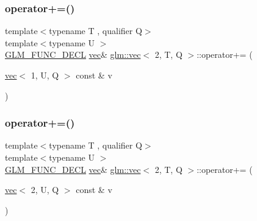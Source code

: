 \subsubsection{\texorpdfstring{operator+=()}{operator+=()}\hspace{0.1cm}{\footnotesize\ttfamily [5/6]}}
{\footnotesize\ttfamily template$<$typename T , qualifier Q$>$ \\
template$<$typename U $>$ \\
\hyperlink{setup_8hpp_ab2d052de21a70539923e9bcbf6e83a51}{G\+L\+M\+\_\+\+F\+U\+N\+C\+\_\+\+D\+E\+CL} \hyperlink{structglm_1_1vec}{vec}\& \hyperlink{structglm_1_1vec}{glm\+::vec}$<$ 2, T, Q $>$\+::operator+= (\begin{DoxyParamCaption}\item[{\hyperlink{structglm_1_1vec}{vec}$<$ 1, U, Q $>$ const \&}]{v }\end{DoxyParamCaption})}

\mbox{\label{structglm_1_1vec_3_012_00_01_t_00_01_q_01_4_aca945ef129a7730690a1b216b5aa67b0}} 
\subsubsection{\texorpdfstring{operator+=()}{operator+=()}\hspace{0.1cm}{\footnotesize\ttfamily [6/6]}}
{\footnotesize\ttfamily template$<$typename T , qualifier Q$>$ \\
template$<$typename U $>$ \\
\hyperlink{setup_8hpp_ab2d052de21a70539923e9bcbf6e83a51}{G\+L\+M\+\_\+\+F\+U\+N\+C\+\_\+\+D\+E\+CL} \hyperlink{structglm_1_1vec}{vec}\& \hyperlink{structglm_1_1vec}{glm\+::vec}$<$ 2, T, Q $>$\+::operator+= (\begin{DoxyParamCaption}\item[{\hyperlink{structglm_1_1vec}{vec}$<$ 2, U, Q $>$ const \&}]{v }\end{DoxyParamCaption})}

\mbox{\label{structglm_1_1vec_3_012_00_01_t_00_01_q_01_4_a213bf05d1d3abd8ed5da4908cd3dfdd7}} 
